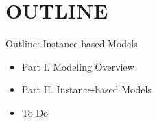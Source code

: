 \documentclass[handout]{beamer}
\begin{document}
\section*{OUTLINE}
\begin{frame}{Outline: Instance-based Models}
\begin{itemize}
\item[] Part I. Modeling Overview
\item[] Part II. Instance-based Models
\vspace*{0.3cm}
\item To Do
\end{itemize}
\end{frame}


\end{document}
